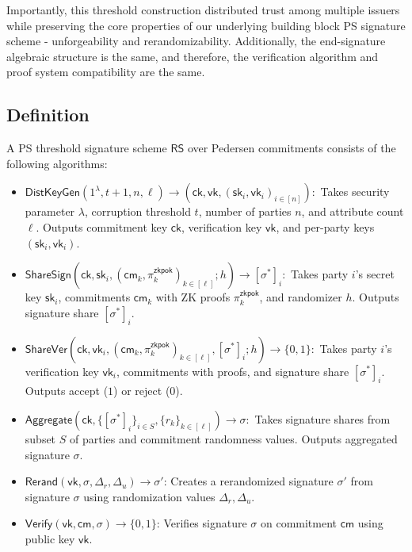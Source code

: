 Importantly, this threshold construction distributed trust among multiple issuers while preserving the core properties of our underlying building block PS signature scheme - unforgeability and rerandomizability. Additionally, the end-signature algebraic structure is the same, and therefore, the verification algorithm and proof system compatibility are the same.
\subsection{Definition}

\begin{definition}
A PS threshold signature scheme $\mathsf{RS}$ over Pedersen commitments consists of the following algorithms:
\begin{itemize}
    \item $\mathsf{DistKeyGen}(1^{\lambda}, t+1, n, \ell) \to (\mathsf{ck}, \mathsf{vk}, (\mathsf{sk}_i, \mathsf{vk}_i)_{i \in [n]}):$ Takes security parameter $\lambda$, corruption threshold $t$, number of parties $n$, and attribute count $\ell$. Outputs commitment key $\mathsf{ck}$, verification key $\mathsf{vk}$, and per-party keys $(\mathsf{sk}_i, \mathsf{vk}_i)$.
    
    \item $\mathsf{ShareSign}(\mathsf{ck}, \mathsf{sk}_i, (\mathsf{cm}_k, \pi_k^{\mathsf{zkpok}})_{k \in [\ell]}; h) \to [\sigma^*]_i:$ Takes party $i$'s secret key $\mathsf{sk}_i$, commitments $\mathsf{cm}_k$ with ZK proofs $\pi_k^{\mathsf{zkpok}}$, and randomizer $h$. Outputs signature share $[\sigma^*]_i$.
    
    \item $\mathsf{ShareVer}(\mathsf{ck}, \mathsf{vk}_i, (\mathsf{cm}_k, \pi_k^{\mathsf{zkpok}})_{k \in [\ell]}, [\sigma^*]_i; h) \to \{0,1\}:$ Takes party $i$'s verification key $\mathsf{vk}_i$, commitments with proofs, and signature share $[\sigma^*]_i$. Outputs accept ($1$) or reject ($0$).
    
    \item $\mathsf{Aggregate}(\mathsf{ck}, \{[\sigma^*]_i\}_{i \in S}, \{r_k\}_{k \in [\ell]}) \to \sigma:$ Takes signature shares from subset $S$ of parties and commitment randomness values. Outputs aggregated signature $\sigma$.

    \item $\mathsf{Rerand}(\mathsf{vk}, \sigma, \Delta_r, \Delta_u) \rightarrow \sigma'$: Creates a rerandomized signature $\sigma'$ from signature $\sigma$ using randomization values $\Delta_r, \Delta_u$.
    
    \item $\mathsf{Verify}(\mathsf{vk}, \mathsf{cm}, \sigma) \rightarrow \{0,1\}$: Verifies signature $\sigma$ on commitment $\mathsf{cm}$ using public key $\mathsf{vk}$.
    
\end{itemize}
\end{definition}




